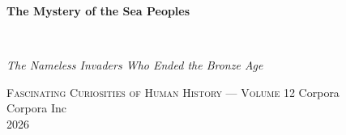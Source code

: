 \clearpage
\vspace*{1.5in}
\begin{center}
  \begin{minipage}{\textwidth}
    \centering
    \Huge\bfseries
    \linespread{1.25}\selectfont
    The Mystery of the Sea Peoples
  \end{minipage}
  \\[3em]
  {\Large\itshape\linespread{1.3}\selectfont
  The Nameless Invaders Who Ended the Bronze Age\par}
  \vspace{2em}
  {\small\scshape Fascinating Curiosities of Human History — Volume 12}
  \vfill
  {\large Corpora}
  \\[1em]
  {\large Corpora Inc}
  \\[1em]
  {\large 2026}
\end{center}
\clearpage
